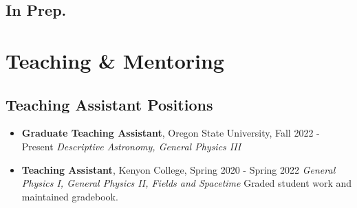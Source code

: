 \documentclass[11pt,letterpaper,sans,unicode]{moderncv}
\newcommand{\blucirc}{{\color{color1} $\circ\;\;$}}
\begin{document}
{\begin{etaremune}[leftmargin=8mm]

\end{etaremune}

\subsection{In Prep.}

% 


%


%

\section{Teaching \& Mentoring}

\subsection{Teaching Assistant Positions}
	\renewcommand\labelitemi{\blucirc}
	\begin{itemize}[leftmargin=8mm]
	\setlength\itemsep{1mm}
	\item \textbf{\color{color1} Graduate Teaching Assistant}, Oregon State University, \hfill Fall 2022 - Present
        		\newline  \textit{Descriptive Astronomy, General Physics III }
	\item \textbf{\color{color1} Teaching Assistant}, Kenyon College, \hfill Spring 2020 - Spring 2022
        		\newline  \textit{General Physics I, General Physics II, Fields and Spacetime}
			\newline Graded student work and maintained gradebook.
	\end{itemize}

}
\end{document}
